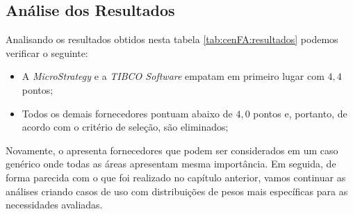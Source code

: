 \subsection*{Análise dos Resultados} 

    Analisando os resultados obtidos nesta tabela \ref{tab:cenFA:resultados} podemos verificar o seguinte:
    
    \begin{itemize}
        \item A \emph{MicroStrategy} e a \emph{TIBCO Software} empatam em primeiro lugar com $4,4$ pontos;
        \item Todos os demais fornecedores pontuam abaixo de $4,0$ pontos e, portanto, de acordo com o critério de seleção, são eliminados;
    \end{itemize}
    
    Novamente, o \cenFA \xspace apresenta fornecedores que podem ser considerados em um caso genérico onde todas as áreas apresentam mesma importância. Em seguida, de forma parecida com o que foi realizado no capítulo anterior, vamos continuar as análises criando casos de uso com distribuições de pesos mais específicas para as necessidades avaliadas.
    
    